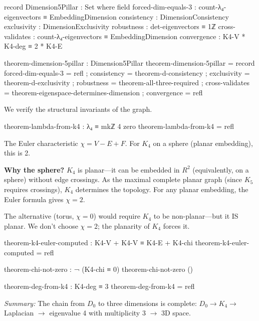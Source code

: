 \documentclass[11pt,a4paper]{book}
\def\mathbb#1{#1}%
\begin{document}
\begin{code}
record Dimension5Pillar : Set where
  field
    forced-dim-equals-3 : count-λ₄-eigenvectors ≡ EmbeddingDimension
    consistency     : DimensionConsistency
    exclusivity     : DimensionExclusivity
    robustness      : det-eigenvectors ≡ 1ℤ
    cross-validates : count-λ₄-eigenvectors ≡ EmbeddingDimension
    convergence     : K4-V * K4-deg ≡ 2 * K4-E

theorem-dimension-5pillar : Dimension5Pillar
theorem-dimension-5pillar = record
  { forced-dim-equals-3 = refl
  ; consistency     = theorem-d-consistency
  ; exclusivity     = theorem-d-exclusivity
  ; robustness      = theorem-all-three-required
  ; cross-validates = theorem-eigenspace-determines-dimension
  ; convergence     = refl
  }

\end{code}

We verify the structural invariants of the graph.

\begin{code}
theorem-lambda-from-k4 : λ₄ ≡ mkℤ 4 zero
theorem-lambda-from-k4 = refl

\end{code}

The Euler characteristic $\chi = V - E + F$. For $K_4$ on a sphere (planar embedding), this is 2.

\textbf{Why the sphere?} $K_4$ is planar---it can be embedded in $\mathbb{R}^2$ (equivalently, on a sphere) 
without edge crossings. As the maximal complete planar graph 
(since $K_5$ requires crossings), $K_4$ determines the topology. For any planar embedding, the Euler formula gives $\chi = 2$.

The alternative (torus, $\chi = 0$) would require $K_4$ to be non-planar---but it IS planar. 
We don't choose $\chi = 2$; the planarity of $K_4$ forces it.

\begin{code}
theorem-k4-euler-computed : K4-V + K4-V ≡ K4-E + K4-chi
theorem-k4-euler-computed = refl

theorem-chi-not-zero : ¬ (K4-chi ≡ 0)
theorem-chi-not-zero ()

\end{code}

\begin{code}
theorem-deg-from-k4 : K4-deg ≡ 3
theorem-deg-from-k4 = refl

\end{code}

\medskip
\noindent\textit{Summary:} The chain from $D_0$ to three dimensions is complete: 
$D_0 \to K_4 \to$ Laplacian $\to$ eigenvalue 4 with multiplicity 3 $\to$ 3D space.
\end{document}
